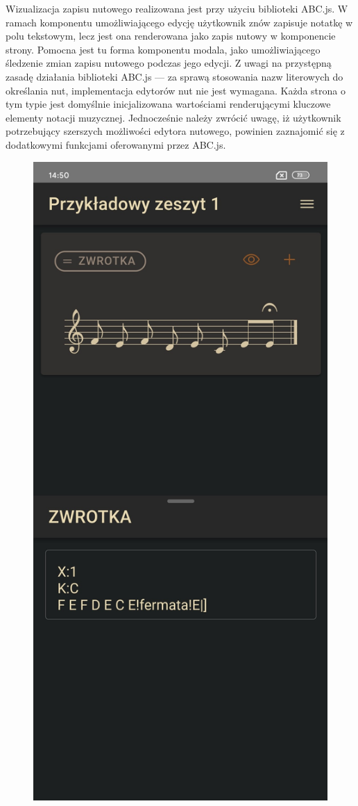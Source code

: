 Wizualizacja zapisu nutowego realizowana jest przy użyciu biblioteki ABC.js. W ramach komponentu umożliwiającego edycję
użytkownik znów zapisuje notatkę w polu tekstowym, lecz jest ona renderowana jako zapis nutowy w komponencie strony.
Pomocna jest tu forma komponentu modala,
jako umożliwiającego śledzenie zmian zapisu nutowego podczas jego edycji. Z uwagi na przystępną zasadę działania biblioteki
ABC.js — za sprawą stosowania nazw literowych do określania nut, implementacja edytorów nut nie jest wymagana.
Każda strona o tym typie jest domyślnie inicjalizowana wartościami renderującymi kluczowe elementy notacji muzycznej.
Jednocześnie należy zwrócić uwagę, iż użytkownik potrzebujący szerszych możliwości edytora nutowego, powinien zaznajomić
się z dodatkowymi funkcjami oferowanymi przez ABC.js.
\begin{figure}[H]
	\begin{center}
		\includegraphics[scale=0.2]{media/ScorePage.jpg}

\end{center}
\end{figure}
